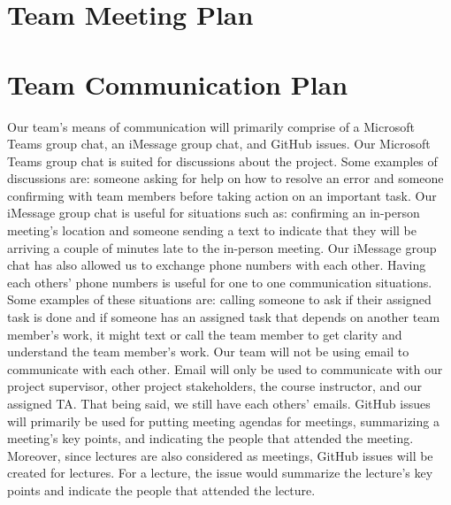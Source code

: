 \documentclass{article}
\begin{document}

\section{Team Meeting Plan}






\section{Team Communication Plan}
Our team's means of communication will primarily comprise of a Microsoft Teams group chat, an iMessage group chat, and GitHub issues. Our Microsoft Teams group chat is suited for discussions about the project.
Some examples of discussions are: someone asking for help on how to resolve an error and someone confirming with team members before 
taking action on an important task. Our iMessage group chat is useful for situations such as:
confirming an in-person meeting's location and someone sending a text to indicate that they will be arriving a couple of minutes late to the
in-person meeting. Our iMessage group chat has also allowed us to exchange phone numbers with each other.
Having each others' phone numbers is useful for one to one communication situations. Some examples of these situations are:
calling someone to ask if their assigned task is done and 
if someone has an assigned task that depends on another team member's work, it might text or call the team member to get clarity and understand the team member's work.
Our team will not be using email to communicate with each other. Email will only be used to communicate with our project supervisor, other project
stakeholders, the course instructor, and our assigned TA. That being said, we still have each others' emails. GitHub issues will primarily be used for putting meeting agendas for meetings,
summarizing a meeting's key points, and indicating the people that attended the meeting. Moreover, since
lectures are also considered as meetings, GitHub issues will be created for lectures. For a lecture, the issue would
summarize the lecture's key points and indicate the people that attended the lecture.
\end{document}
